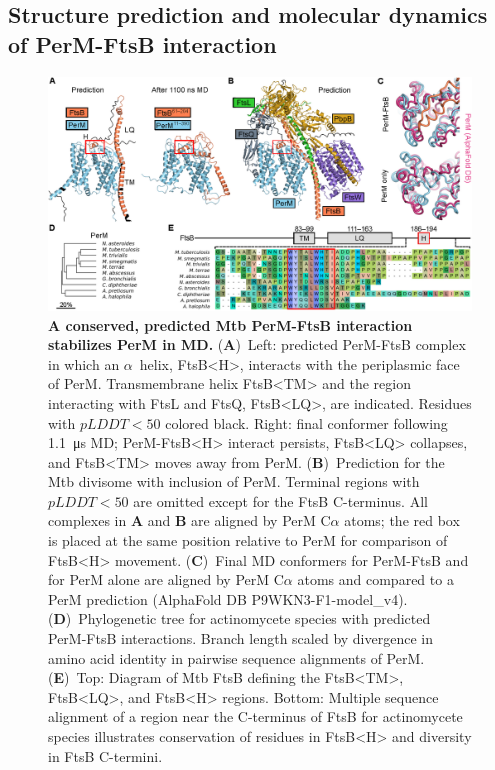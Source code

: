 \documentclass[pdflatex,sn-nature]{sn-jnl}%
\def\textsuperscript#1{<#1>}%
\newcommand\mtb{Mtb}
\newcommand\ftsbTM{FtsB\textsuperscript{TM}}
\newcommand\ftsbLQ{FtsB\textsuperscript{LQ}}
\newcommand\ftsbH{FtsB\textsuperscript{H}}
\begin{document}
\subsection{Structure prediction and molecular dynamics of PerM-FtsB interaction}

\begin{figure}[t]
    \centering
    \includegraphics[width=1.0\textwidth]{./fig1.eps}
    \caption{
        \textbf{A conserved, predicted \mtb{} PerM-FtsB interaction stabilizes PerM in MD.}
        (\textbf{A})~Left: predicted PerM-FtsB complex in which an $\alpha$~helix, \ftsbH{}, interacts with the periplasmic face of PerM. Transmembrane helix \ftsbTM{} and the region interacting with FtsL and FtsQ, \ftsbLQ{}, are indicated. Residues with $pLDDT < 50$ colored black. Right: final conformer following \qty{1.1}{\us} MD; PerM-\ftsbH{} interact persists, \ftsbLQ{} collapses, and \ftsbTM{} moves away from PerM.
        (\textbf{B})~Prediction for the \mtb{} divisome with inclusion of PerM. Terminal regions with $pLDDT < 50$ are omitted except for the FtsB C-terminus. All complexes in \textbf{A} and \textbf{B} are aligned by PerM C$\alpha$ atoms; the red box is placed at the same position relative to PerM for comparison of \ftsbH{} movement.
        (\textbf{C})~Final MD conformers for PerM-FtsB and for PerM alone are aligned by PerM C$\alpha$ atoms and compared to a PerM prediction  (AlphaFold DB P9WKN3-F1-model{\_}v4).
        (\textbf{D})~Phylogenetic tree for actinomycete species with predicted PerM-FtsB interactions. Branch length scaled by divergence in amino acid identity in pairwise sequence alignments of PerM.
        (\textbf{E})~Top: Diagram of \mtb{} FtsB defining the \ftsbTM{}, \ftsbLQ{}, and \ftsbH{} regions. Bottom: Multiple sequence alignment of a region near the C-terminus of FtsB for actinomycete species illustrates conservation of residues in \ftsbH{} and diversity in FtsB C-termini.
    }\label{fig1}
\end{figure}
\end{document}
